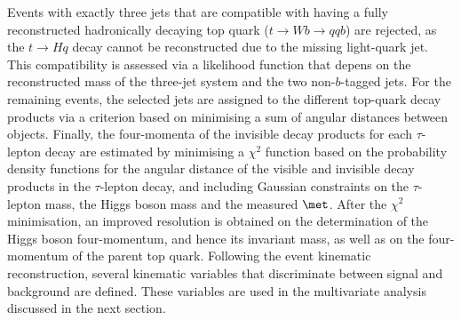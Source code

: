 Events with exactly three jets that are compatible with having a fully reconstructed hadronically decaying 
top quark ($t \to Wb \to qqb$) are rejected, as the $t \to Hq$ decay cannot be reconstructed due to the missing light-quark jet.
This compatibility is assessed via a likelihood function that depens on the reconstructed mass of the three-jet 
system and the two non-$b$-tagged jets.
For the remaining events, the selected jets are assigned to the different top-quark decay products via a criterion based on 
minimising a sum of angular distances between objects. Finally, the four-momenta of the invisible decay products for each $\tau$-lepton decay 
are estimated by minimising a $\chi^2$ function based on the probability density functions for the angular distance of the visible and invisible
decay products in the $\tau$-lepton decay, and including Gaussian constraints on the $\tau$-lepton mass, the Higgs boson mass and the
measured $\met$. After the $\chi^2$ minimisation, an improved resolution is obtained on the determination of the Higgs boson four-momentum, and hence
its invariant mass, as well as on the four-momentum of the parent top quark. Following the event kinematic reconstruction, several kinematic variables
that discriminate between signal and background are defined. These variables are used in the multivariate analysis discussed in the next section.

